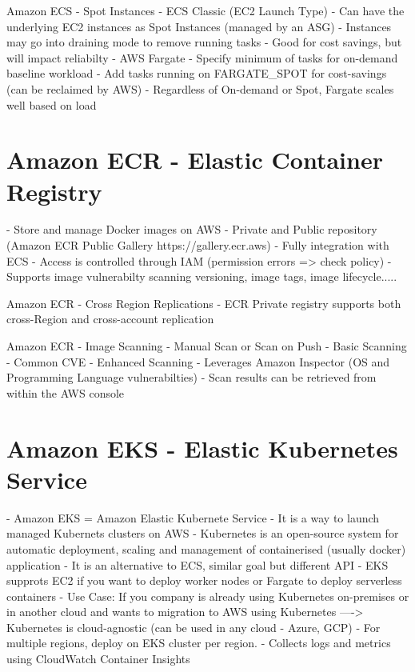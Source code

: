 \documentclass[11pt]{book}
\begin{document}
    Amazon ECS - Spot Instances
    - ECS Classic (EC2 Launch Type)
        - Can have the underlying EC2 instances as Spot Instances (managed by an ASG)
        - Instances may go into draining mode to remove running tasks
        - Good for cost savings, but will impact reliabilty
    - AWS Fargate
        - Specify minimum of tasks for on-demand baseline workload
        - Add tasks running on FARGATE\_SPOT for cost-savings (can be reclaimed by AWS)
        - Regardless of On-demand or Spot, Fargate scales well based on load

    \section{Amazon ECR - Elastic Container Registry}
    - Store and manage Docker images on AWS
    - Private and Public repository (Amazon ECR Public Gallery https://gallery.ecr.aws)
    - Fully integration with ECS
    - Access is controlled through IAM (permission errors => check policy)
    - Supports image vulnerabilty scanning versioning, image tags, image lifecycle.....


    Amazon ECR - Cross Region Replications
    - ECR Private registry supports both cross-Region and cross-account replication

    Amazon ECR - Image Scanning
    - Manual Scan or Scan on Push
    - Basic Scanning - Common CVE
    - Enhanced Scanning - Leverages Amazon Inspector (OS and Programming Language vulnerabilties) %
    - Scan results can be retrieved from within the AWS console

    \section{Amazon EKS - Elastic Kubernetes Service}
    - Amazon EKS = Amazon Elastic Kubernete Service
    - It is a way to launch managed Kubernets clusters on AWS
    - Kubernetes is an open-source system for automatic deployment, scaling and management of containerised (usually docker) application
    - It is an alternative to ECS, similar goal but different API
    - EKS supprots EC2 if you want to deploy worker nodes or Fargate to deploy serverless containers
    - Use Case: If you company is already using Kubernetes on-premises or in another cloud and wants to migration to AWS using Kubernetes
    ----> Kubernetes is cloud-agnostic (can be used in any cloud - Azure, GCP)
    - For multiple regions, deploy on EKS cluster per region.
    - Collects logs and metrics using CloudWatch Container Insights
\end{document}
